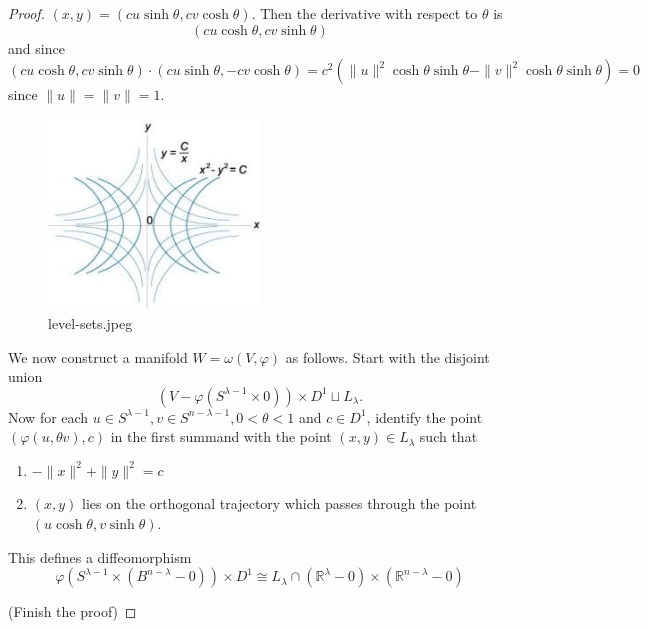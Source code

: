 \documentclass[reqno]{amsart}
\theoremstyle{definition}
\theoremstyle{remark}
\begin{document}
\begin{proof}
    $(x,y) = \left( c u \sinh \theta, c v \cosh \theta \right) $.
    Then the derivative with respect to $\theta$ is
    \[
        \left( c u \cosh \theta,
        c v \sinh \theta \right) 
    \] 
    and since
    \[
        \left( c u \cosh \theta,
        c v \sinh \theta\right) \cdot 
        \left( cu \sinh \theta, - cv \cosh \theta \right) 
        = c^2 \left( \|u\|^2 \cosh \theta \sinh \theta
        - \|v\|^2 \cosh \theta \sinh \theta \right) 
        = 0
    \] 
    since $\|u\|=\|v\| = 1$.


    \begin{figure}[htpb]
        \centering
        \includegraphics[width=0.5\textwidth]{level-sets.jpeg}
        \caption{level-sets.jpeg}
        \label{fig:level-sets-jpeg}
    \end{figure}

    We now construct a manifold
    $W = \omega \left( V, \varphi  \right) $ as follows.
    Start with the disjoint union
    \[
        \left( V - \varphi 
        \left( S^{\lambda-1} \times 0 \right) \right) \times 
        D^{1} \sqcup L_{\lambda}.
    \] 
    Now for each $u \in S^{\lambda-1}, v\in 
    S^{n-\lambda-1}, 0 < \theta < 1$ and
    $c \in D^{1}$, identify the point
    $\left( \varphi (u,\theta v), c \right) $ in the
    first summand with the point
    $\left( x,y  \right) \in L_{\lambda}$ such that
    \begin{enumerate}
        \item $- \|x\|^2 + \|y\|^2 = c$ 
        \item $\left( x,y \right) $ lies on the orthogonal
            trajectory which passes through the point
            $\left( u \cosh \theta, v \sinh \theta \right) $.
    \end{enumerate}
    This defines a diffeomorphism
    \[
    \varphi \left( S^{\lambda-1} \times 
    \left( B^{n-\lambda} - 0 \right) \right) \times D^{1}
    \cong L_{\lambda} \cap
    \left( \mathbb{R}^{\lambda}-0 \right) \times
    \left( \mathbb{R}^{n-\lambda}
    -0\right) 
    \] 

    (Finish the proof)

\end{proof}
\end{document}
